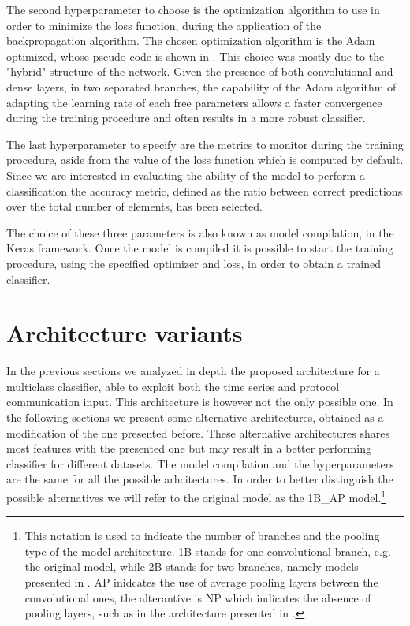 The second hyperparameter to choose is the optimization algorithm to use in order to minimize the loss function, during the application of the backpropagation algorithm. 
The chosen optimization algorithm is the Adam optimized, whose pseudo-code is shown in .
This choice was mostly due to the "hybrid" structure of the network. Given the presence of both convolutional and dense layers, in two separated branches, the capability of the Adam algorithm of adapting the learning rate of each free parameters allows a faster convergence during the training procedure and often results in a more robust classifier.

The last hyperparameter to specify are the metrics to monitor during the training procedure, aside from the value of the loss function which is computed by default. Since we are interested in evaluating the ability of the model to perform a classification the accuracy metric, defined as the ratio between correct predictions over the total number of elements, has been selected. 

The choice of these three parameters is also known as model compilation, in the Keras framework. Once the model is compiled it is possible to start the training procedure, using the specified optimizer and loss, in order to obtain a trained classifier.

\section{Architecture variants} \label{modelalt}

In the previous sections we analyzed in depth the proposed architecture for a multiclass classifier, able to exploit both the time series and protocol communication input. This architecture is however not the only possible one. In the following sections we present some alternative architectures, obtained as a modification of the one presented before. These alternative architectures shares most features with the presented one but may result in a better performing classifier for different datasets. The model compilation and the hyperparameters are the same for all the possible arhcitectures. 
In order to better distinguish the possible alternatives we will refer to the original model as the 1B\_AP model.\footnote{This notation is used to indicate the number of branches and the pooling type of the model architecture. 1B stands for one convolutional branch, e.g. the original model, while 2B stands for two branches, namely models presented in . AP inidcates the use of average pooling layers between the convolutional ones, the alterantive is NP which indicates the absence of pooling layers, such as in the architecture presented in .  }

